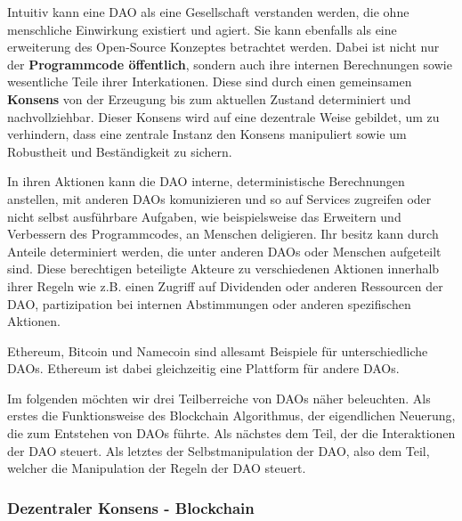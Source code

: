 \documentclass[]{article}
\begin{document}
Intuitiv kann eine DAO als eine Gesellschaft verstanden werden, die ohne menschliche Einwirkung existiert und agiert. Sie kann ebenfalls als eine erweiterung des Open-Source Konzeptes betrachtet werden. Dabei ist nicht nur der \textbf{Programmcode öffentlich}, sondern auch ihre internen Berechnungen sowie wesentliche Teile ihrer Interkationen. Diese sind durch einen gemeinsamen \textbf{Konsens} von der Erzeugung bis zum aktuellen Zustand determiniert und nachvollziehbar. Dieser Konsens wird auf eine dezentrale Weise gebildet, um zu verhindern, dass eine zentrale Instanz den Konsens manipuliert sowie um Robustheit und Beständigkeit zu sichern.

In ihren Aktionen kann die DAO interne, deterministische Berechnungen anstellen, mit anderen DAOs komunizieren und so auf Services zugreifen oder nicht selbst ausführbare Aufgaben, wie beispielsweise das Erweitern und Verbessern des Programmcodes, an Menschen deligieren. Ihr besitz kann durch Anteile determiniert werden, die unter anderen DAOs oder Menschen aufgeteilt sind. Diese berechtigen beteiligte Akteure zu verschiedenen Aktionen innerhalb ihrer Regeln wie z.B. einen Zugriff auf Dividenden oder anderen Ressourcen der DAO, partizipation bei internen Abstimmungen oder anderen spezifischen Aktionen. 

Ethereum, Bitcoin und Namecoin sind allesamt Beispiele für unterschiedliche DAOs. Ethereum ist dabei gleichzeitig eine Plattform für andere DAOs.


Im folgenden möchten wir drei Teilberreiche von DAOs näher beleuchten. Als erstes die Funktionsweise des Blockchain Algorithmus, der eigendlichen Neuerung, die zum Entstehen von DAOs führte. Als nächstes dem Teil, der die Interaktionen der DAO steuert. Als letztes der Selbstmanipulation der DAO, also dem Teil, welcher die Manipulation der Regeln der DAO steuert.


\subsubsection*{Dezentraler Konsens - Blockchain}
\end{document}

